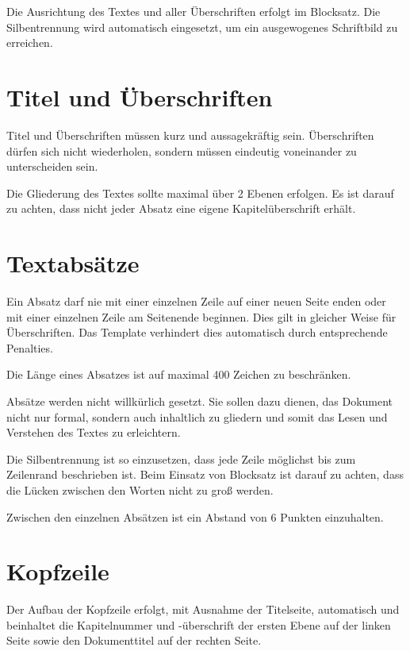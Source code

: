 Die Ausrichtung des Textes und aller Überschriften erfolgt im Blocksatz. Die Silbentrennung wird automatisch eingesetzt, um ein ausgewogenes Schriftbild zu erreichen.

\section{Titel und Überschriften}
\label{sec:titel_ueberschriften}

Titel und Überschriften müssen kurz und aussagekräftig sein. Überschriften dürfen sich nicht wiederholen, sondern müssen eindeutig voneinander zu unterscheiden sein.

Die Gliederung des Textes sollte maximal über 2 Ebenen erfolgen. Es ist darauf zu achten, dass nicht jeder Absatz eine eigene Kapitelüberschrift erhält.

\section{Textabsätze}
\label{sec:textabsaetze}

Ein Absatz darf nie mit einer einzelnen Zeile auf einer neuen Seite enden oder mit einer einzelnen Zeile am Seitenende beginnen. Dies gilt in gleicher Weise für Überschriften. Das Template verhindert dies automatisch durch entsprechende Penalties.

Die Länge eines Absatzes ist auf maximal 400 Zeichen zu beschränken.

Absätze werden nicht willkürlich gesetzt. Sie sollen dazu dienen, das Dokument nicht nur formal, sondern auch inhaltlich zu gliedern und somit das Lesen und Verstehen des Textes zu erleichtern.

Die Silbentrennung ist so einzusetzen, dass jede Zeile möglichst bis zum Zeilenrand beschrieben ist. Beim Einsatz von Blocksatz ist darauf zu achten, dass die Lücken zwischen den Worten nicht zu groß werden.

Zwischen den einzelnen Absätzen ist ein Abstand von 6 Punkten einzuhalten.

\section{Kopfzeile}
\label{sec:kopfzeile}

Der Aufbau der Kopfzeile erfolgt, mit Ausnahme der Titelseite, automatisch und beinhaltet die Kapitelnummer und -überschrift der ersten Ebene auf der linken Seite sowie den Dokumenttitel auf der rechten Seite.

